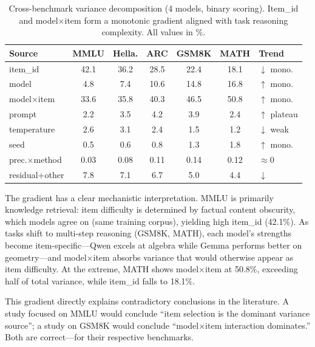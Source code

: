 \documentclass[11pt,a4paper]{article}
\begin{document}
\begin{table}[t]
\centering
\caption{Cross-benchmark variance decomposition (4 models, binary scoring). Item\_id and model$\times$item form a monotonic gradient aligned with task reasoning complexity. All values in \%.}
\label{tab:gradient}
\small
\begin{tabular}{lcccccl}
\toprule
\textbf{Source} & \textbf{MMLU} & \textbf{Hella.} & \textbf{ARC} & \textbf{GSM8K} & \textbf{MATH} & \textbf{Trend} \\
\midrule
item\_id            & 42.1 & 36.2 & 28.5 & 22.4 & 18.1 & $\downarrow$ mono. \\
model               &  4.8 &  7.4 & 10.6 & 14.8 & 16.8 & $\uparrow$ mono. \\
model$\times$item   & 33.6 & 35.8 & 40.3 & 46.5 & 50.8 & $\uparrow$ mono. \\
prompt              &  2.2 &  3.5 &  4.2 &  3.9 &  2.4 & $\uparrow$ plateau \\
temperature         &  2.6 &  3.1 &  2.4 &  1.5 &  1.2 & $\downarrow$ weak \\
seed                &  0.5 &  0.6 &  0.8 &  1.3 &  1.8 & $\uparrow$ mono. \\
prec.$\times$method &  0.03 & 0.08 & 0.11 & 0.14 & 0.12 & $\approx$0 \\
residual+other      &  7.8 &  7.1 &  6.7 &  5.0 &  4.4 & $\downarrow$ \\
\bottomrule
\end{tabular}
\end{table}

The gradient has a clear mechanistic interpretation.
MMLU is primarily knowledge retrieval: item difficulty is determined by factual content obscurity, which models agree on (same training corpus), yielding high item\_id (42.1\%).
As tasks shift to multi-step reasoning (GSM8K, MATH), each model's strengths become item-specific---Qwen excels at algebra while Gemma performs better on geometry---and model$\times$item absorbs variance that would otherwise appear as item difficulty.
At the extreme, MATH shows model$\times$item at 50.8\%, exceeding half of total variance, while item\_id falls to 18.1\%.

This gradient directly explains contradictory conclusions in the literature.
A study focused on MMLU would conclude ``item selection is the dominant variance source''; a study on GSM8K would conclude ``model$\times$item interaction dominates.''
Both are correct---for their respective benchmarks.
\end{document}
